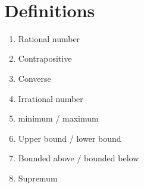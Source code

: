 \documentclass[12pt]{amsart}
\begin{document}

\

\section*{Definitions}

\begin{enumerate}
	\item Rational number
	\item Contrapositive
	\item Converse
	\item Irrational number
	\item minimum / maximum
	\item Upper bound / lower bound
	\item Bounded above / bounded below
	\item Supremum%
			\begin{comment}
	\item Absolute value
	\item (sequence) converges to $L$

	\item (sequence) is convergent
	\item (sequence) is divergent

	\item increasing / decreasing sequence
	\item strictly increasing / decreasing sequence
	\item monotone sequence
	\item diverges to $+\infty$ or $-\infty$		
					
	\item Subsequence
	



	\item Limit of a function

	\item Continuous at a point
	\item Continuous on an open interval

	\item Continuous on a closed interval
	
	\item Differentiable
	\item Derivative (at a point)
	\item Derivative (function)
		\item Increasing/decreasing function

\end{comment}
\end{enumerate}
\end{document}
